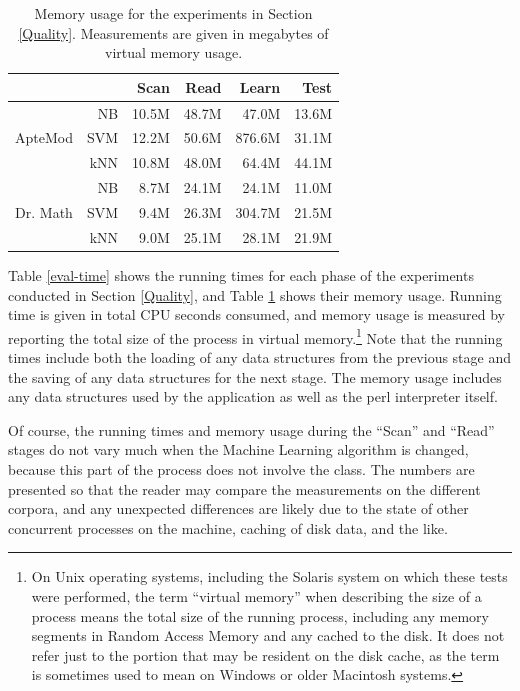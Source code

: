 \begin{table}
\begin{center}
\begin{tabular}{|c|r|r r r r|}
\cline{3-6}
\multicolumn{2}{c|}{}
                 &  Scan &  Read  & Learn  & Test  \\ \hline
           & NB  & 10.5M & 48.7M  & 47.0M  & 13.6M \\
ApteMod    & SVM & 12.2M & 50.6M  & 876.6M & 31.1M \\
           & kNN & 10.8M & 48.0M  & 64.4M  & 44.1M \\ \hline
           & NB  & 8.7M  & 24.1M  & 24.1M  & 11.0M \\
Dr. Math   & SVM & 9.4M  & 26.3M  & 304.7M & 21.5M \\
           & kNN & 9.0M  & 25.1M  & 28.1M  & 21.9M \\ \hline
\end{tabular}
\end{center}
\caption[Memory usage for the experiments in Section \ref{Quality}]
 {Memory usage for the experiments in Section \ref{Quality}.
  Measurements are given in megabytes of virtual memory usage.}
\label{eval-memory}
\end{table}

Table \ref{eval-time} shows the running times for each phase of the
experiments conducted in Section \ref{Quality}, and Table
\ref{eval-memory} shows their memory usage.
Running time is given in total CPU seconds consumed,
and memory usage is measured by reporting the total size of the
process in virtual memory.\footnote{On Unix operating systems,
  including the Solaris system on which these tests were performed,
  the term ``virtual memory'' when describing the size of a process
  means the total size of the running process, including any memory
  segments in Random Access Memory and any cached to the disk.  It
  does not refer just to the portion that may be resident on the disk
  cache, as the term is sometimes used to mean on Windows or older
  Macintosh systems.}
Note that the running times include both
the loading of any data structures from the previous stage and the
saving of any data structures for the next stage.  The memory usage
includes any data structures used by the application as well as the
perl interpreter itself.

Of course, the running times and memory usage during the ``Scan'' and
``Read'' stages do not vary much when the Machine Learning algorithm
is changed, because this part of the process does not involve the
 class.  The numbers are presented so that the reader
may compare the measurements on the different corpora, and any
unexpected differences are likely due to the state of other concurrent
processes on the machine, caching of disk data, and the like.

